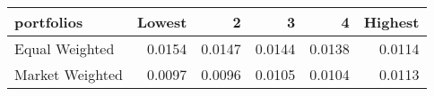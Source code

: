 \begin{tabular}{lrrrrr}
\toprule
portfolios & Lowest & 2 & 3 & 4 & Highest \\
\midrule
Equal Weighted & 0.0154 & 0.0147 & 0.0144 & 0.0138 & 0.0114 \\
Market Weighted & 0.0097 & 0.0096 & 0.0105 & 0.0104 & 0.0113 \\
\bottomrule
\end{tabular}
